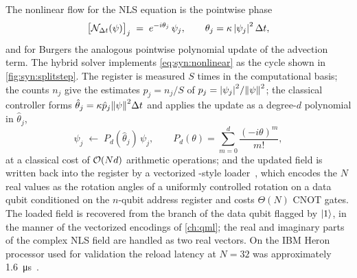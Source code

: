 The nonlinear flow for the NLS equation is the pointwise phase
\begin{equation}\label{eq:syn:nonlinear}
  \big[\mathcal{N}_{\Delta t}(\psi)\big]_j \;=\; e^{-i\theta_j}\,\psi_j,\qquad \theta_j=\kappa\,\abs{\psi_j}^{2}\,\Delta t ,
\end{equation}
and for Burgers the analogous pointwise polynomial update of the advection term. The hybrid solver implements \cref{eq:syn:nonlinear} as the cycle shown in \cref{fig:syn:splitstep}. The register is measured $S$ times in the computational basis; the counts $n_j$ give the estimates $\hat p_j=n_j/S$ of $p_j=\abs{\psi_j}^{2}/\norm{\psi}^{2}$; the classical controller forms $\hat\theta_j=\kappa\hat p_j\norm{\psi}^{2}\Delta t$ and applies the update as a degree-$d$ polynomial in $\hat\theta_j$,
\begin{equation}\label{eq:syn:poly}
  \psi_j \;\leftarrow\; P_d(\hat\theta_j)\,\psi_j,\qquad P_d(\theta)=\sum_{m=0}^{d}\frac{(-i\theta)^{m}}{m!},
\end{equation}
at a classical cost of $\mathcal{O}\!\left(Nd\right)$ arithmetic operations; and the updated field is written back into the register by a vectorized \qcrank{}-style loader~\cite{balewski2024qcrank,mottonen2004ucr}, which encodes the $N$ real values as the rotation angles of a uniformly controlled rotation on a data qubit conditioned on the $n$-qubit address register and costs $\Theta(N)$ CNOT gates. The loaded field is recovered from the branch of the data qubit flagged by $\ket{1}$, in the manner of the vectorized encodings of \cref{ch:qml}; the real and imaginary parts of the complex NLS field are handled as two real vectors. On the IBM Heron processor used for validation the reload latency at $N=32$ was approximately \SI{1.6}{\micro\second}~\cite{guo2026nonlinearwaves}.

